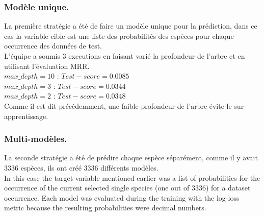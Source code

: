 \documentclass{article}
\begin{document}
\subsubsection{Modèle unique.}
La première stratégie a été de faire un modèle unique pour la prédiction, dans ce cas la variable cible est une liste des probabilités des espèces pour chaque occurrence des données de test.\\
L'équipe a soumis 3 executions en faisant varié la profondeur de l'arbre et en utilisant l'évaluation MRR.\\
$max\_depth = 10 $  :  $ Test-score = 0.0085 $\\
$max\_depth = 3 $    :  $ Test-score = 0.0344 $\\
$max\_depth = 2 $    :  $ Test-score = 0.0348 $\\
Comme il est dit précédemment, une faible profondeur de l'arbre évite le sur-apprentissage.
\subsubsection{Multi-modèles.}
La seconde stratégie a été de prédire chaque espèce séparément, comme il y avait 3336 espèces, ils ont créé 3336 différents modèles.\\
In this case the target variable mentioned earlier was a list of probabilities for the occurrence of the current selected single species (one out of 3336) for a dataset occurrence. Each model was evaluated during the training with the log-loss metric because the resulting probabilities were decimal numbers.\\
\end{document}
